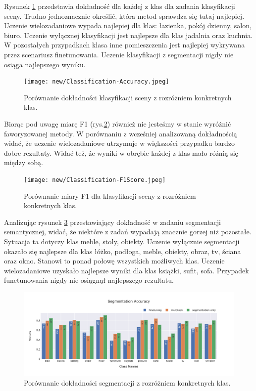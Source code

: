 \vspace{0.5cm}
Rysunek \ref{fig:classification-accuracy} przedstawia dokładność dla każdej z klas dla zadania klasyfikacji sceny. Trudno jednoznacznie określić, która metod sprawdza się tutaj najlepiej. Uczenie wielozadaniowe wypada najlepiej dla klas: łazienka, pokój dzienny, salon, biuro. Uczenie wyłącznej klasyfikacji jest najlepsze dla klas jadalnia oraz kuchnia. W pozostałych przypadkach klasa inne pomieszczenia jest najlepiej wykrywana przez scenariusz finetunowania. Uczenie klasyfikacji z segmentacji nigdy nie osiąga najlepszego wyniku.
\begin{figure}[ht!]
    \centering
    \texttt{[image: new/Classification-Accuracy.jpeg]}
    \caption{Porównanie dokładności klasyfikacji sceny z rozróżniem konkretnych klas.}
    \label{fig:classification-accuracy}
\end{figure}
Biorąc pod uwagę miarę F1 (rys.\ref{fig:classification-f1}) również nie jesteśmy w stanie wyróżnić faworyzowanej metody. W porównaniu z wcześniej analizowaną dokładnością widać, że uczenie wielozadaniowe utrzymuje w większości przypadku bardzo dobre rezultaty. Widać też, że wyniki w obrębie każdej z klas mało różnią się między sobą.
\begin{figure}[ht!]
    \centering
    \texttt{[image: new/Classification-F1Score.jpeg]}
    \caption{Porównanie miary F1 dla klasyfikacji sceny z rozróżniem konkretnych klas.}
    \label{fig:classification-f1}
\end{figure}

\vspace{0.5cm}
Analizując rysunek \ref{fig:segmentation-acc} przestawiający dokładność w zadaniu segmentacji semantycznej, widać, że niektóre z zadań wypadają znacznie gorzej niż pozostałe. Sytuacja ta dotyczy klas meble, stoły, obiekty. Uczenie wyłącznie segmentacji okazało się najlepsze dla klas łóżko, podłoga, meble, obiekty, obraz, tv, ściana oraz okno. Stanowi to ponad połowę wszystkich możliwych klas. Uczenie wielozadaniowe uzyskało najlepsze wyniki dla klas książki, sufit, sofa. Przypadek funetunowania nigdy nie osiągnął najlepszego rezultatu.
\begin{figure}[ht!]
    \centering
    \includegraphics[width=\textwidth]{result_imgs_sorted/Segmentation-Accuracy.jpeg}
    \caption{Porównanie dokładności segmentacji z rozróżniem konkretnych klas.}
    \label{fig:segmentation-acc}
\end{figure}

